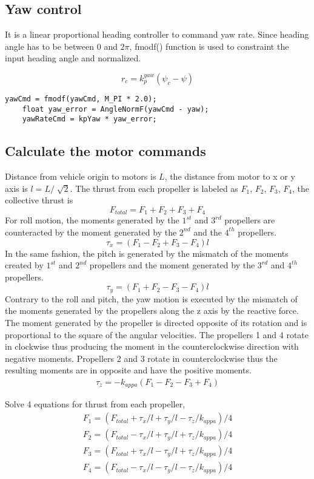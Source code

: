 \documentclass[letterpaper]{article}
\begin{document}
\subsection{Yaw control} \label{control:yaw}
 It is a linear proportional heading controller to command yaw rate. Since heading angle has to be between 0 and $2\pi$, fmodf() function is used to constraint the input heading angle and normalized.

$$ r_c = k_p^{yaw} (\psi_c - \psi) $$

\begin{lstlisting}[frame=single]
    yawCmd = fmodf(yawCmd, M_PI * 2.0);
    float yaw_error = AngleNormF(yawCmd - yaw);
    yawRateCmd = kpYaw * yaw_error;
\end{lstlisting}

\subsection{Calculate the motor commands } \label{control:motorcommand}

Distance from vehicle origin to motors is $L$, the distance from motor to x or y axis is $ l = L/\sqrt[]{2}$. The thrust from each propeller is labeled as $F_1$, $F_2$, $F_3$, $F_4$, the collective thrust is
$$ F_{total} = F_1 + F_2 + F_3 + F_4 $$
For roll motion, the moments generated by the $1^{st}$ and $3^{rd}$ propellers are counteracted by the moment generated by the $2^{nd}$ and the $4^{th}$ propellers. 
$$ \tau_x = (F_1 - F_2 + F_3 - F_4)l $$
In the same fashion, the pitch is generated by the mismatch of the moments created by $1^{st}$ and $2^{nd}$ propellers and the moment generated by the $3^{rd}$ and $4^{th}$ propellers.
$$ \tau_y = (F_1 + F_2 - F_3 - F_4)l $$
Contrary to the roll and pitch, the yaw motion is executed by the mismatch of the moments generated by the propellers along the z axis by the reactive force. The moment generated by the propeller is directed opposite of its rotation and is proportional to the square of the angular velocities. The propellers 1 and 4 rotate in clockwise thus producing the moment in the counterclockwise direction with negative moments. Propellers 2 and 3 rotate in counterclockwise thus the resulting moments are in opposite and have the positive moments.
\begin{align*}
\tau_z = -k_{appa}  (F_1 - F_2 - F_3 + F_4)
\end{align*}

 Solve  4 equations for thrust from each propeller,
\begin{align*}
F_1 = (F_{total} + \tau_x / l + \tau_y / l  -\tau_z / k_{appa})/4  \\
F_2 = (F_{total} - \tau_x / l + \tau_y / l  +\tau_z / k_{appa})/4 \\
F_3 = (F_{total} + \tau_x / l - \tau_y / l  +\tau_z / k_{appa})/4 \\
F_4 = (F_{total} - \tau_x / l - \tau_y / l  -\tau_z / k_{appa})/4
\end{align*}
\end{document}
